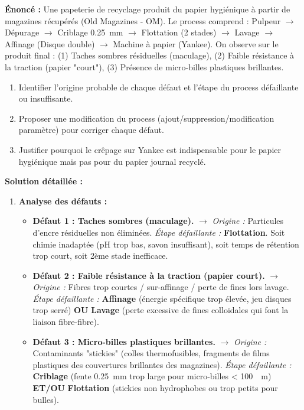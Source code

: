 \documentclass[11pt]{article}
\begin{document}
\begin{exoresolu}
\textbf{Énoncé :} Une papeterie de recyclage produit du papier hygiénique à partir de magazines récupérés (Old Magazines - OM). Le process comprend : Pulpeur $\rightarrow$ Dépurage $\rightarrow$ Criblage \SI{0,25}{mm} $\rightarrow$ Flottation (2 stades) $\rightarrow$ Lavage $\rightarrow$ Affinage (Disque double) $\rightarrow$ Machine à papier (Yankee).
On observe sur le produit final : (1) Taches sombres résiduelles (maculage), (2) Faible résistance à la traction (papier "court"), (3) Présence de micro-billes plastiques brillantes.
\begin{enumerate}
    \item Identifier l'origine probable de chaque défaut et l'étape du process défaillante ou insuffisante.
    \item Proposer une modification du process (ajout/suppression/modification paramètre) pour corriger chaque défaut.
    \item Justifier pourquoi le crêpage sur Yankee est indispensable pour le papier hygiénique mais pas pour du papier journal recyclé.
\end{enumerate}
\tcblower
\textbf{Solution détaillée :}
\begin{enumerate}
    \item \textbf{Analyse des défauts :}
    \begin{itemize}
        \item \textbf{Défaut 1 : Taches sombres (maculage).} $\rightarrow$ \textit{Origine :} Particules d'encre résiduelles non éliminées. \textit{Étape défaillante :} \textbf{Flottation}. Soit chimie inadaptée (pH trop bas, savon insuffisant), soit temps de rétention trop court, soit 2ème stade inefficace.
        \item \textbf{Défaut 2 : Faible résistance à la traction (papier court).} $\rightarrow$ \textit{Origine :} Fibres trop courtes / sur-affinage / perte de fines lors lavage. \textit{Étape défaillante :} \textbf{Affinage} (énergie spécifique trop élevée, jeu disques trop serré) \textbf{OU} \textbf{Lavage} (perte excessive de fines colloïdales qui font la liaison fibre-fibre).
        \item \textbf{Défaut 3 : Micro-billes plastiques brillantes.} $\rightarrow$ \textit{Origine :} Contaminants "stickies" (colles thermofusibles, fragments de films plastiques des couvertures brillantes des magazines). \textit{Étape défaillante :} \textbf{Criblage} (fente \SI{0,25}{mm} trop large pour micro-billes < \SI{100}{\mu m}) \textbf{ET/OU} \textbf{Flottation} (stickies non hydrophobes ou trop petits pour bulles).
    \end{itemize}
    

\end{enumerate}
\end{exoresolu}
\end{document}
